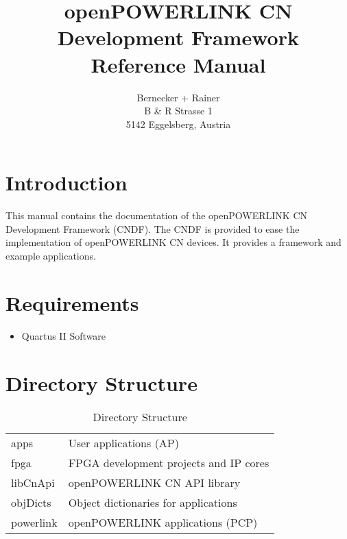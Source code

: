 \documentclass[a4paper,10pt]{article}
\title{openPOWERLINK CN Development Framework\\Reference Manual}
\date{}
\author{Bernecker + Rainer\\ B \& R Strasse 1\\ 5142 Eggelsberg, Austria\\}
\begin{document}
\maketitle
\newpage

\tableofcontents %
\cleardoublepage %

\pagestyle{headings} %

\section{Introduction}
\label{sec:Introduction}
This manual contains the documentation of the openPOWERLINK CN Development Framework (CNDF). The CNDF is provided to ease the implementation of openPOWERLINK CN devices. It provides a framework and example applications. 

\section{Requirements}
\label{sec:Requirements}
\begin{itemize}
	\item Quartus II Software
\end{itemize}

\section{Directory Structure}
\label{sec:DirectoryStructure}
\begin{table}[ht]
		\begin{tabular}{ll}
			apps 			& User applications (AP)\\
			fpga			& FPGA development projects and IP cores \\
			libCnApi		& openPOWERLINK CN API library \\
			objDicts		& Object dictionaries for applications \\
			powerlink		& openPOWERLINK applications (PCP) \\			
		\end{tabular}
	\caption{Directory Structure}
	\label{tab:DirectoryStructure}
\end{table}





\clearpage
{}
\listoffigures
\clearpage
{}
\listoftables
\end{document}
